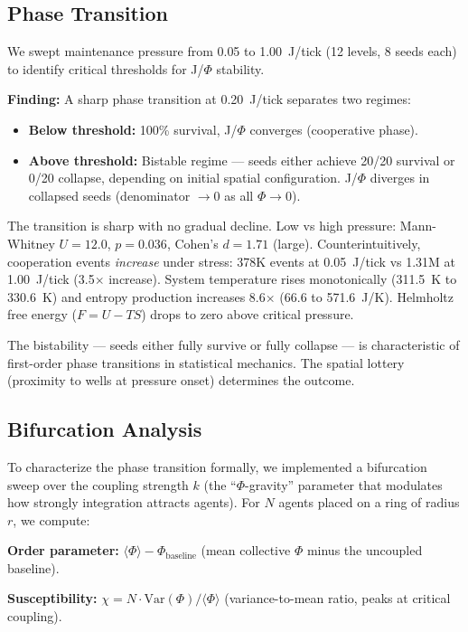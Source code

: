 \documentclass[entropy,article]{Definitions/mdpi}
\begin{document}
\subsection{Phase Transition}
\label{sec:phase}

We swept maintenance pressure from 0.05 to 1.00~J/tick (12 levels, 8 seeds each) to identify critical thresholds for J/$\Phi$ stability.

\textbf{Finding:} A sharp phase transition at 0.20~J/tick separates two regimes:
\begin{itemize}
\item \textbf{Below threshold:} 100\% survival, J/$\Phi$ converges (cooperative phase).
\item \textbf{Above threshold:} Bistable regime --- seeds either achieve 20/20 survival or 0/20 collapse, depending on initial spatial configuration. J/$\Phi$ diverges in collapsed seeds (denominator $\to 0$ as all $\Phi \to 0$).
\end{itemize}

The transition is sharp with no gradual decline. Low vs high pressure: Mann-Whitney $U = 12.0$, $p = 0.036$, Cohen's $d = 1.71$ (large). Counterintuitively, cooperation events \emph{increase} under stress: 378K events at 0.05~J/tick vs 1.31M at 1.00~J/tick (3.5$\times$ increase). System temperature rises monotonically (311.5~K to 330.6~K) and entropy production increases 8.6$\times$ (66.6 to 571.6~J/K). Helmholtz free energy ($F = U - TS$) drops to zero above critical pressure.

The bistability --- seeds either fully survive or fully collapse --- is characteristic of first-order phase transitions in statistical mechanics. The spatial lottery (proximity to wells at pressure onset) determines the outcome.

\subsection{Bifurcation Analysis}
\label{sec:bifurcation}

To characterize the phase transition formally, we implemented a bifurcation sweep over the coupling strength $k$ (the ``$\Phi$-gravity'' parameter that modulates how strongly integration attracts agents). For $N$ agents placed on a ring of radius $r$, we compute:

\textbf{Order parameter:} $\langle\Phi\rangle - \Phi_{\text{baseline}}$ (mean collective $\Phi$ minus the uncoupled baseline).

\textbf{Susceptibility:} $\chi = N \cdot \text{Var}(\Phi) / \langle\Phi\rangle$ (variance-to-mean ratio, peaks at critical coupling).
\end{document}

